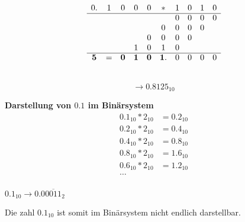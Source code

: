 \documentclass{article}
\begin{document}
\hfill
\vrule
\hfill
\begin{minipage}[t]{.4\textwidth}
  \[
    \begin{array}{cccc cccc cc}
      0.&1&0&0&0 &* &1&0&1&0 \\
      \cline{0-9}
        & & & &  &  &0&0&0&0 \\
        & & & &  &0 &0&0&0 \\
        & & & &0 &0 &0&0 \\
        & & &1&0 &1 &0 \\
      \cline{0-9}
      \bm{5}&=&\bm{0}&\bm{1}&\bm{0}&\bm{1}.&0&0&0&0 \\
    \end{array}
  \]
\end{minipage}  \\

\[
  \rightarrow 0.8125_{10}
\]

\textbf{Darstellung von $0.1$ im Binärsystem} \\

\begin{align*}
  0.1_{10} * 2_{10} &= \boxed{0}.2_{10} \\
  0.2_{10} * 2_{10} &= \boxed{0}.4_{10} \\
  0.4_{10} * 2_{10} &= \boxed{0}.8_{10} \\
  0.8_{10} * 2_{10} &= \boxed{1}.6_{10} \\
  0.6_{10} * 2_{10} &= \boxed{1}.2_{10} \\
  \ldots \\
\end{align*}

$0.1_{10} \to 0.0\overline{0011}_2$

Die zahl $0.1_{10}$ ist somit im Binärsystem nicht endlich darstellbar.
\end{document}
